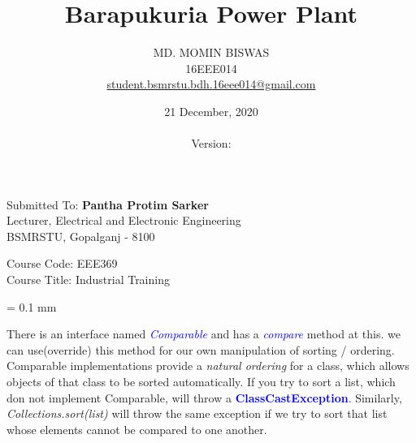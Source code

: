 \documentclass[11 pt]{article}
\title{\textcolor{Firebrick4}{\textbf{Barapukuria Power Plant}}}
\author
{
	MD. MOMIN BISWAS\\
	16EEE014\\
	\href{mailto:student.bsmrstu.bdh.16eee014@gmail.com}{\textcolor{DeepSkyBlue4}{student.bsmrstu.bdh.16eee014@gmail.com}}
}
\date{21 December, 2020 \\ \currenttime \\ Version: \version}
\affil{Department of EEE, BSMRSTU}
\begin{document}
\pagecolor{Green2}
\maketitle

\pagebreak

\pagecolor{white}

\begin{center}
	Submitted To: \textbf{{\Large Pantha Protim Sarker}} \\
	Lecturer, Electrical and Electronic Engineering \\
	BSMRSTU, Gopalganj - 8100 \\
\end{center}

\vspace{20 mm}

Course Code: EEE369 \\
Course Title: Industrial Training

\columnseprule = 0.1 mm
\begin{multicols}{2}
There is an interface named \textit{\textcolor{blue}{Comparable}} and has a \textit{\textcolor{blue}{compare}} method at this. we can use(override) this method for our own manipulation of sorting / ordering. \textsf{Comparable} implementations provide a \textit{natural ordering} for a class, which allows objects of that class to be sorted automatically.\linebreak
If you try to sort a list, which don not implement Comparable, will throw a \textbf{\textcolor{blue}{ClassCastException}}. Similarly, \textit{Collections.sort(list)} will throw the same exception if we try to sort that list whose elements cannot be compared to one another.
\end{multicols}

\pagebreak

\tableofcontents
\pagebreak
\listoffigures

\pagebreak

\justify
\end{document}
